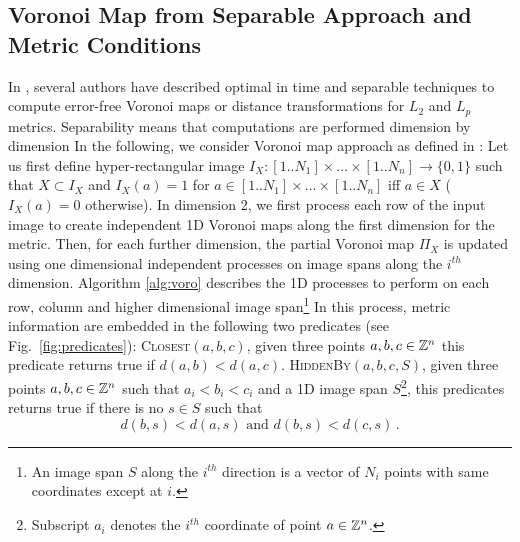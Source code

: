 \documentclass{llncs}
\begin{document}
\subsection{Voronoi Map from Separable Approach and Metric Conditions}
\label{sec:voronoi-map-from}
In \cite{Hirata,BreuEtAl95,roerdnik,Maurer2003},
several authors have described optimal in time and separable
techniques to compute error-free Voronoi maps or distance
transformations for $L_2$ and $L_p$ metrics. Separability means that
computations are performed dimension by dimension
In the following, we
consider Voronoi map approach as defined in \cite{BreuEtAl95}: Let us
first define hyper-rectangular image $I_X:
[1..N_1]\times\ldots\times[1..N_n] \rightarrow \{0,1\}$ such that $X\subset
I_X$ and $I_X(a)= 1$ for $a\in [1..N_1]\times\ldots\times[1..N_n]$ iff $a\in
X$ ($I_X(a)=0$ otherwise). In dimension 2, we first process each row
of the input image to create independent 1D Voronoi maps along the
first dimension for the metric. Then, for each further dimension, the
partial Voronoi map $\Pi_X$ is updated using one dimensional
independent processes on image spans along the $i^{th}$ dimension.
Algorithm \ref{alg:voro} describes the 1D processes to perform on each
row, column and higher dimensional image span\footnote{An image span
  $S$ along the $i^{th}$ direction is a vector of $N_i$ points with
  same coordinates except at $i$.} In this process, metric information
are embedded in the following two predicates (see
Fig.~\ref{fig:predicates}): \textsc{Closest}$(a, b, c)$, given three
points $a,b,c\in{\mathbb{Z}}^n$ this predicate returns true if $d(a,b) <
d(a,c)$. \textsc{HiddenBy}$(a, b, c, S)$, given three points
$a,b,c\in{\mathbb{Z}}^n$ such that $a_i<b_i<c_i$ and a 1D image span
$S$\footnote{Subscript $a_i$ denotes the $i^{th}$ coordinate of point
  $a\in{\mathbb{Z}}^n$.}, this
predicates returns true if there is no $s\in S$ such that
    \begin{equation}
      d(b,s) < d(a,s)\text{ and }  d(b,s) < d(c,s)\,.
    \end{equation}
\end{document}
